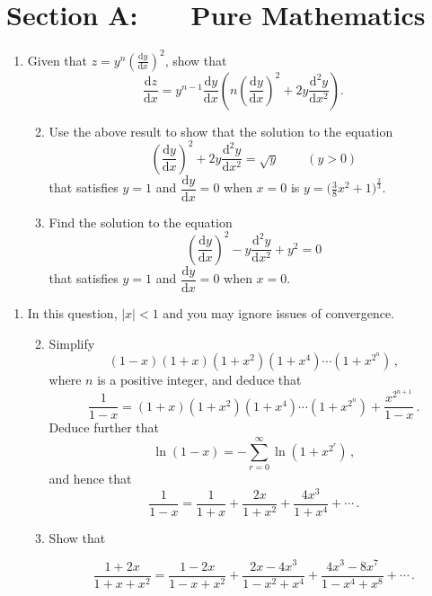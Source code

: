 \documentclass[a4, 11pt]{report}
\newlength{\qspace}
\newcounter{qnumber}
\newenvironment{question}%
 {\vspace{\qspace}
  \begin{enumerate}[\bfseries 1\quad][10]%
    \setcounter{enumi}{\value{qnumber}}%
    \item%
 }
{
  \end{enumerate}
  \filbreak
  \stepcounter{qnumber}
 }
\newenvironment{questionparts}[1][1]%
 {
  \begin{enumerate}[\bfseries (i)]%
    \setcounter{enumii}{#1}
    \addtocounter{enumii}{-1}
    \setlength{\itemsep}{5mm}
    \setlength{\parskip}{8pt}
 }
 {
  \end{enumerate}
 }
\def\d{{\mathrm d}}
\begin{document}
\setcounter{page}{2}

 
\section*{Section A: \ \ \ Pure Mathematics}

\begin{question}
Given that $\displaystyle z = y^n \left( \frac{\d y}{\d x}\right)^{\!2}$, show that
\[
\frac{\d z}{\d x} = 
y^{n-1} \frac{\d y}{\d x} \left( n \left(\frac{\d y}{\d x}\right)^{\!2} + 2y \frac{\d^2y}{\d x^2}\right)
.
\]
\begin{questionparts}
\item
Use the above result to show that the solution to the equation
\[
\left(\frac{\d y}{\d x}\right)^{\!2}
+ 2y \frac{\d^2y}{\d x^2} = \sqrt y \ \ \ \ \ \ \ \ \ \ (y>0)
\]
that satisfies $y=1$ and $\dfrac{\d y}{\d x}=0$ when $x=0$ is 
$y= \big  ( \frac38 x^2+1\big)^{\frac23}$.
\item
Find the solution to the equation
\[
\left(\frac{\d y}{\d x}\right)^{\!2}
 -y \frac{\d^2y}{\d x^2} + y^2=0 
\]
that satisfies $y=1$ and $\dfrac{\d y}{\d x}=0$ when $x=0$.


\end{questionparts}
\end{question}
\vspace{-0.5cm}

\begin{question}
In this question, $\vert x \vert <1$ and you may ignore issues of convergence.

\begin{questionparts}

\item
Simplify 
\[
 (1-x)(1+x)(1+x^2)(1+x^4) \cdots (1+x^{2^n})\,,
\]
where $n$ is a positive integer,
and deduce that
\[
\frac1{1-x} 
= (1+x)(1+x^2)(1+x^4) \cdots (1+x^{2^n}) + \frac {x^{2^{n+1}}}{1-x}\,.
\]
 Deduce further that
\[
\ln(1-x) = - \sum_{r=0}^\infty \ln \left  (1+ x ^{2^r}\right)
\,,
\]
and hence that 
\[
\frac1 {1-x} = \frac 1 {1+x} + \frac {2x}{1+x^2} + \frac {4x^3}{1+x^4}
+\cdots\,.
\]

\item
Show that

\[
\frac{1+2x}{1+x+x^2} = \frac{1-2x}{1-x+x^2} + \frac{2x-4x^3}{1-x^2+x^4}
+ \frac {4x^3-8x^7}{1-x^4+x^8} + \cdots\,.
\]

\end{questionparts}
\end{question}
\end{document}
